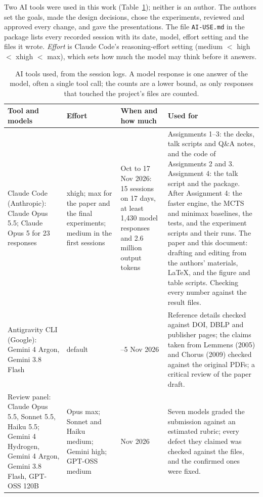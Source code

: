 \documentclass[a4paper,10pt]{article}
\begin{document}
Two AI tools were used in this work (Table~\ref{tab:ai}); neither is an author. The authors set the goals, made the
design decisions, chose the experiments, reviewed and approved every change, and gave the presentations. The file
\texttt{AI-USE.md} in the package lists every recorded session with its date, model, effort setting and the files it
wrote. \emph{Effort} is Claude Code's reasoning-effort setting (medium $<$ high $<$ xhigh $<$ max), which sets how much
the model may think before it answers.

\begin{table}[!htbp]
\centering\caption{AI tools used, from the session logs. A model response is one answer of the model, often a single
tool call; the counts are a lower bound, as only responses that touched the project's files are counted.}\label{tab:ai}
\footnotesize
\begin{tabular}{@{}>{\raggedright\arraybackslash}p{2.8cm}>{\raggedright\arraybackslash}p{2.4cm}%
>{\raggedright\arraybackslash}p{3.0cm}>{\raggedright\arraybackslash}p{7.3cm}@{}}
\toprule
Tool and models & Effort & When and how much & Used for \\
\midrule
Claude Code (Anthropic): Claude Opus 5.5; Claude Opus 5 for 23 responses & xhigh; max for the paper and the final
experiments; medium in the first sessions & 3 Oct to 17 Nov 2026: 15 sessions on 17 days, at least 1,430 model
responses and 2.6 million output tokens & Assignments 1--3: the decks, talk scripts and Q\&A notes, and the code of
Assignments 2 and 3. Assignment 4: the talk script and the package. After Assignment 4: the faster engine, the MCTS
and minimax baselines, the tests, and the experiment scripts and their runs. The paper and this document: drafting
and editing from the authors' materials, \LaTeX, and the figure and table scripts. Checking every number against the
result files. \\
\addlinespace
Antigravity CLI (Google): Gemini 4 Argon, Gemini 3.8 Flash & default & 4--5 Nov 2026 & Reference details checked
against DOI, DBLP and publisher pages; the claims taken from Lemmens (2005) and Chorus (2009) checked against the
original PDFs; a critical review of the paper draft. \\
\addlinespace
Review panel: Claude Opus 5.5, Sonnet 5.5, Haiku 5.5; Gemini 4 Hydrogen, Gemini 4 Argon, Gemini 3.8 Flash, GPT-OSS
120B & Opus max; Sonnet and Haiku medium; Gemini high; GPT-OSS medium & 17 Nov 2026 & Seven models graded the
submission against an estimated rubric; every defect they claimed was checked against the files, and the confirmed
ones were fixed. \\
\bottomrule
\end{tabular}
\end{table}
\end{document}
